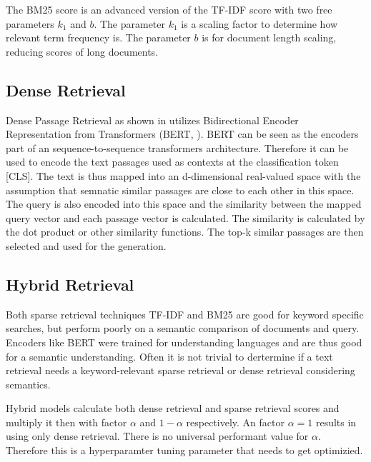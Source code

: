 The BM25 score is an advanced version of the TF-IDF score with two free parameters $k_1$ and $b$. The parameter $k_1$ is a scaling factor to determine how relevant term frequency is. The parameter $b$ is for document length scaling, reducing scores of long documents.

\subsection{Dense Retrieval}
\label{sec:dense_retrieval}

Dense Passage Retrieval as shown in \citet{karpukhin2020densepassageretrievalopendomain} utilizes Bidirectional Encoder Representation from Transformers (BERT, \citet{devlin2019bertpretrainingdeepbidirectional}). BERT can be seen as the encoders part of an sequence-to-sequence transformers architecture. Therefore it can be used to encode the text passages used as contexts at the classification token [CLS]. The text is thus mapped into an d-dimensional real-valued space with the assumption that semnatic similar passages are close to each other in this space. The query is also encoded into this space and the similarity between the mapped query vector and each passage vector is calculated. The similarity is calculated by the dot product or other similarity functions. The top-k similar passages are then selected and used for the generation.

\subsection{Hybrid Retrieval}
\label{sec:hybrid_retrieval}

Both sparse retrieval techniques TF-IDF and BM25 are good for keyword specific searches, but perform poorly on a semantic comparison of documents and query. Encoders like BERT were trained for understanding languages and are thus good for a semantic understanding. Often it is not trivial to dertermine if a text retrieval needs a keyword-relevant sparse retrieval or dense retrieval considering semantics. 

Hybrid models calculate both dense retrieval and sparse retrieval scores and multiply it then with factor $\alpha$ and $1-\alpha$ respectively. An factor $\alpha=1$ results in using only dense retrieval. There is no universal performant value for $\alpha$. Therefore this is a hyperparamter tuning parameter that needs to get optimizied.

